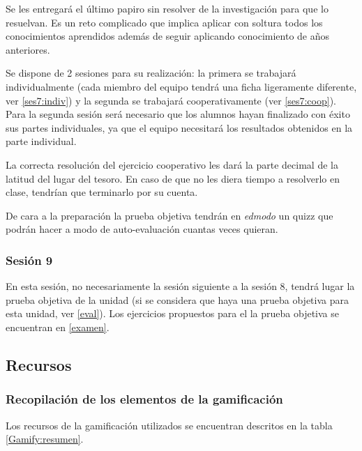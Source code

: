 Se les entregará el último papiro sin resolver de la investigación para que lo resuelvan.
%
Es un reto complicado que implica aplicar con soltura todos los conocimientos aprendidos además de seguir aplicando conocimiento de años anteriores.


Se dispone de 2 sesiones para su realización: la primera se trabajará individualmente (cada miembro del equipo tendrá una ficha ligeramente diferente, ver \ref{ses7:indiv}) y la segunda se trabajará cooperativamente (ver \ref{ses7:coop}).
%
Para la segunda sesión será necesario que los alumnos hayan finalizado con éxito sus partes individuales, ya que el equipo necesitará los resultados obtenidos en la parte individual.

La correcta resolución del ejercicio cooperativo les dará la parte decimal de la latitud del lugar del tesoro.
%
En caso de que no les diera tiempo a resolverlo en clase, tendrían que terminarlo por su cuenta.

De cara a la preparación la prueba objetiva tendrán en \textit{edmodo} un quizz que podrán hacer a modo de auto-evaluación cuantas veces quieran.

\subsubsection{Sesión 9}

En esta sesión, no necesariamente la sesión siguiente a la sesión 8, tendrá lugar la prueba objetiva de la unidad (si se considera que haya una prueba objetiva para esta unidad, ver \ref{eval}).
%
Los ejercicios propuestos para el la prueba objetiva se encuentran en \ref{examen}.

\subsection{Recursos}

\subsubsection{Recopilación de los elementos de la gamificación }

Los recursos de la gamificación utilizados se encuentran descritos en la tabla \ref{Gamify:resumen}.

